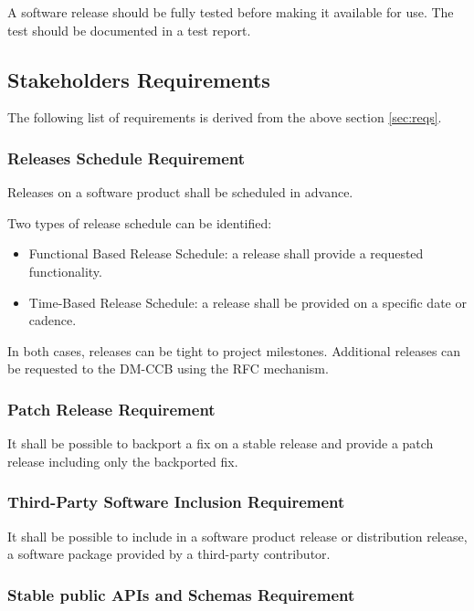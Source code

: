 A software release should be fully tested before making it available for use.
The test should be documented in a test report.


\subsection{Stakeholders Requirements} \label{sec:stakeholdersreqs}

The following list of requirements is derived from the above section \ref{sec:reqs}.


\subsubsection{Releases Schedule Requirement} \label{sec:milestone}

Releases on a software product shall be scheduled in advance.

Two types of release schedule can be identified:

\begin{itemize}
\item Functional Based Release Schedule: a release shall provide a requested functionality.
\item Time-Based Release Schedule: a release shall be provided on a specific date or cadence.
\end{itemize}

In both cases, releases can be tight to project milestones.
Additional releases can be requested to the DM-CCB using the RFC mechanism.


\subsubsection{Patch Release Requirement} \label{sec:backport}

It shall be possible to backport a fix on a stable release and provide a patch release including only the backported fix.


\subsubsection{Third-Party Software Inclusion Requirement} \label{sec:thirdsw}

It shall be possible to include in a software product release or distribution release, a software package provided by a third-party contributor.


\subsubsection{Stable public APIs and Schemas Requirement} \label{sec:stable}

